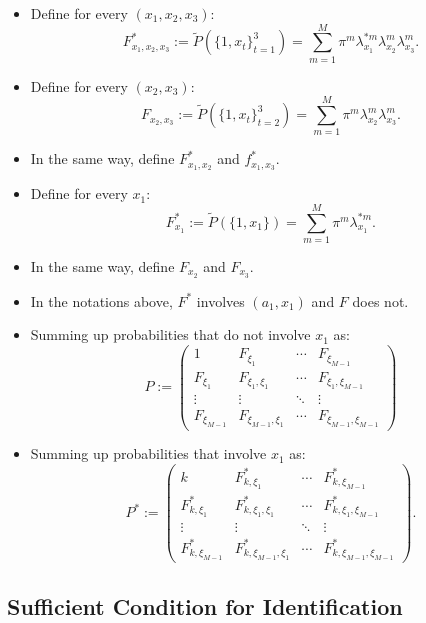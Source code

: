 \documentclass[]{book}
\providecommand{\tightlist}{%
  \setlength{\itemsep}{0pt}\setlength{\parskip}{0pt}}
\begin{document}
\begin{itemize}
\tightlist
\item
  Define for every \((x_1, x_2, x_3)\): \[
  F_{x_1, x_2, x_3}^* := \widetilde{P}(\{1, x_t\}_{t = 1}^3) = \sum_{m = 1}^M \pi^m \lambda_{x_1}^{*m} \lambda_{x_2}^m \lambda_{x_3}^m.
  \]
\item
  Define for every \((x_2, x_3)\): \[
  F_{x_2, x_3} := \widetilde{P}(\{1, x_t\}_{t = 2}^3) = \sum_{m = 1}^M \pi^m \lambda_{x_2}^m \lambda_{x_3}^m.
  \]
\item
  In the same way, define \(F_{x_1, x_2}^*\) and \(f_{x_1, x_3}^*\).
\item
  Define for every \(x_1\): \[
  F_{x_1}^* := \widetilde{P}(\{1, x_1\}) = \sum_{m = 1}^M \pi^m \lambda_{x_1}^{*m}.
  \]
\item
  In the same way, define \(F_{x_2}\) and \(F_{x_3}\).
\item
  In the notations above, \(F^*\) involves \((a_1, x_1)\) and \(F\) does
  not.
\item
  Summing up probabilities that do not involve \(x_1\) as: \[
  P :=
  \begin{pmatrix}
  1 & F_{\xi_1} & \cdots & F_{\xi_{M - 1}}\\
  F_{\xi_1} & F_{\xi_1, \xi_1} & \cdots & F_{\xi_1, \xi_{M - 1}}\\
  \vdots & \vdots & \ddots & \vdots\\
  F_{\xi_{M - 1}} & F_{\xi_{M - 1}, \xi_1} & \cdots & F_{\xi_{M - 1}, \xi_{M - 1}}
  \end{pmatrix}
  \]
\item
  Summing up probabilities that involve \(x_1\) as: \[
  P^* :=
  \begin{pmatrix}
  k & F^*_{k, \xi_1} & \cdots & F^*_{k, \xi_{M - 1}}\\
  F^*_{k, \xi_1} & F^*_{k, \xi_1, \xi_1} & \cdots & F^*_{k, \xi_1, \xi_{M - 1}}\\
  \vdots & \vdots & \ddots & \vdots\\
  F^*_{k, \xi_{M - 1}} & F^*_{k, \xi_{M - 1}, \xi_1} & \cdots & F^*_{k, \xi_{M - 1}, \xi_{M - 1}}
  \end{pmatrix}.
  \]
\end{itemize}

\subsection{Sufficient Condition for
Identification}\label{sufficient-condition-for-identification}
\end{document}
